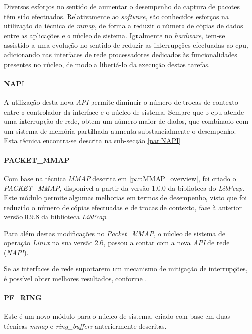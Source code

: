 Diversos esforços no sentido de aumentar o desempenho da captura de pacotes têm sido efectuados.
Relativamente ao \textit{software}, são conhecidos esforços na utilização da técnica de \textit{mmap}, de forma a reduzir o número de cópias de dados entre as aplicações e o núcleo de sistema.
Igualmente no \textit{hardware}, tem-se assistido a uma evolução no sentido de reduzir as interrupções efectuadas ao cpu, adicionando nas interfaces de rede processadores dedicados às funcionalidades presentes no núcleo, de modo a libertá-lo da execução destas tarefas.

\paragraph*{NAPI}

A utilização desta nova \textit{API} permite diminuir o número de trocas de contexto entre o controlador da interface e o núcleo de sistema.
Sempre que o cpu atende uma interrupção de rede, obtem um número maior de dados, que combinado com um sistema de memória partilhada aumenta substancialmente o desempenho.
Esta técnica encontra-se descrita na sub-secção \ref{par:NAPI}

\paragraph*{PACKET\_MMAP}

Com base na técnica \textit{MMAP} descrita em \ref{par:MMAP_overview}, foi criado o \textit{PACKET\_MMAP}, disponível a partir da versão 1.0.0 da biblioteca do \textit{LibPcap}.
Este módulo permite algumas melhorias em termos de desempenho, visto que foi reduzido o número de cópias efectuadas e de trocas de contexto, face à anterior versão 0.9.8 da biblioteca \textit{LibPcap}.

Para além destas modificações no \textit{Packet\_MMAP}, o núcleo de sistema de operação \textit{Linux} na sua versão 2.6, passou a contar com a nova \textit{API} de rede (\textit{NAPI}).

Se as interfaces de rede suportarem um mecanismo de mitigação de interrupções, é possível obter melhores resultados, conforme \cite{Deri2004}.

\paragraph*{PF\_RING}

Este é um novo módulo para o núcleo de sistema, criado com base em duas técnicas \textit{mmap} e \textit{ring\_buffers} anteriormente descritas.

